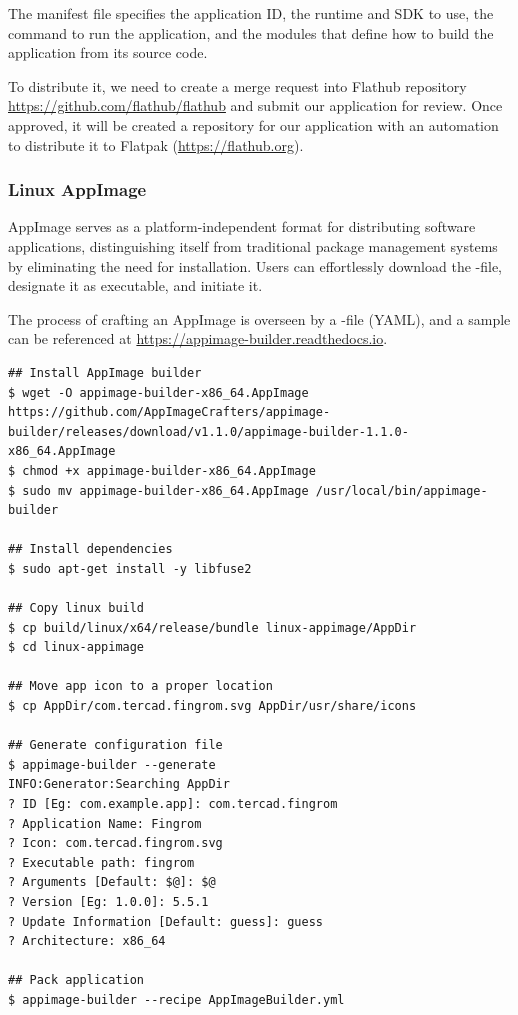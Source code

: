 \noindent The manifest file specifies the application ID, the runtime and SDK to use, the command to run the application,
and the modules that define how to build the application from its source code.

To distribute it, we need to create a merge request into Flathub repository
\href{https://github.com/flathub/flathub}{https://github.com/flathub/flathub}
and submit our application for review. Once approved, it will be created a repository for our application with an 
automation to distribute it to Flatpak (\href{https://flathub.org}{https://flathub.org}).


\subsubsection{Linux AppImage}

AppImage serves as a platform-independent format for distributing software applications, distinguishing itself from 
traditional package management systems by eliminating the need for installation. Users can effortlessly download the 
-file, designate it as executable, and initiate it.

The process of crafting an AppImage is overseen by a -file (YAML), and a sample can be referenced at 
\href{https://appimage-builder.readthedocs.io}{https://appimage-builder.readthedocs.io}.

\begin{lstlisting}[language=terminal]
## Install AppImage builder
$ wget -O appimage-builder-x86_64.AppImage https://github.com/AppImageCrafters/appimage-builder/releases/download/v1.1.0/appimage-builder-1.1.0-x86_64.AppImage
$ chmod +x appimage-builder-x86_64.AppImage
$ sudo mv appimage-builder-x86_64.AppImage /usr/local/bin/appimage-builder

## Install dependencies
$ sudo apt-get install -y libfuse2

## Copy linux build
$ cp build/linux/x64/release/bundle linux-appimage/AppDir
$ cd linux-appimage

## Move app icon to a proper location
$ cp AppDir/com.tercad.fingrom.svg AppDir/usr/share/icons

## Generate configuration file
$ appimage-builder --generate
INFO:Generator:Searching AppDir
? ID [Eg: com.example.app]: com.tercad.fingrom
? Application Name: Fingrom
? Icon: com.tercad.fingrom.svg
? Executable path: fingrom
? Arguments [Default: $@]: $@
? Version [Eg: 1.0.0]: 5.5.1
? Update Information [Default: guess]: guess
? Architecture: x86_64

## Pack application
$ appimage-builder --recipe AppImageBuilder.yml
\end{lstlisting}

